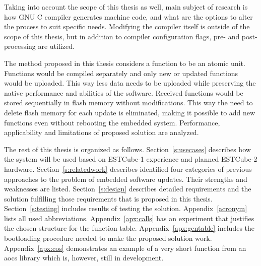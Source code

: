 Taking into account the scope of this thesis as well, main subject of research is how GNU C compiler generates machine code, and what are the options to alter the process to suit specific needs. Modifying the compiler itself is outside of the scope of this thesis, but in addition to compiler configuration flags, pre- and post-processing are utilized.

The method proposed in this thesis considers a function to be an atomic unit. Functions would be compiled separately and only new or updated functions would be uploaded. This way less data needs to be uploaded while preserving the native performance and abilities of the software. Received functions would be stored sequentially in flash memory without modifications. This way the need to delete flash memory for each update is eliminated, making it possible to add new functions even without rebooting the embedded system. Performance, applicability and limitations of proposed solution are analyzed.

The rest of this thesis is organized as follows. Section~\ref{s:usecases} describes how the system will be used based on ESTCube-1 experience and planned ESTCube-2 hardware. Section~\ref{s:relatedwork} describes identified four categories of previous approaches to the problem of embedded software updates. Their strengths and weaknesses are listed. Section~\ref{s:design} describes detailed requirements and the solution fulfilling those requirements that is proposed in this thesis. Section~\ref{s:testing} includes results of testing the solution. Appendix~\ref{acronym} lists all used abbreviations. Appendix~\ref{apx:calls} has an experiment that justifies the chosen structure for the function table. Appendix~\ref{apx:gentable} includes the bootloading procedure needed to make the proposed solution work. Appendix~\ref{apx:cos} demonstrates an example of a very short function from an \gls{aocs} library which is, however, still in development.
